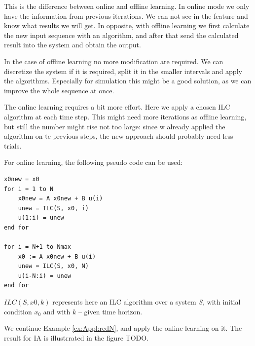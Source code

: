 This is the difference between online and offline learning. In online mode we only have the information from previous iterations. We can not see in the feature and know what results we will get. In opposite, with offline learning we first calculate the new input sequence with an algorithm, and after that send the calculated result into the system and obtain the output. 

In the case of offline learning no more modification are required. We can discretize the system if it is required, split it in the smaller intervals and apply the algorithms. Especially for simulation this might be a good solution, as we can improve the whole sequence at once. 

The online learning requires a bit more effort. Here we apply a chosen ILC algorithm at each time step. This might need more iterations as offline learning, but still the number might rise not too large: since w already applied the algorithm on te previous steps, the new approach should probably need less trials. 

For online learning, the following pseudo code can be used: 
\begin{lstlisting}
x0new = x0
for i = 1 to N 
	x0new = A x0new + B u(i)
	unew = ILC(S, x0, i)
	u(1:i) = unew
end for

for i = N+1 to Nmax
	x0 := A x0new + B u(i) 
	unew = ILC(S, x0, N)
	u(i-N:i) = unew
end for
\end{lstlisting}	

$ILC(S, x0, k)$
 represents here an ILC algorithm over a system $S$, with initial condition $x_0$ and with $k$ -- given time horizon. 


\begin{exam}
	We continue Example \ref{ex:Appl:redN}, and apply the online learning on it. 
	The result for IA is illustrrated in the figure TODO. 
\end{exam}
	
	
	
	